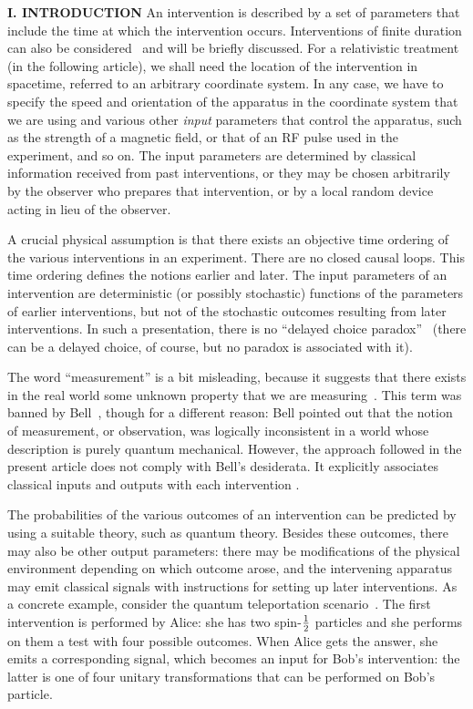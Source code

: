\begin{center}{\bf I. INTRODUCTION}
An intervention is described by a set of parameters that include the
time at which the intervention occurs. Interventions of finite duration
can also be considered~\cite{PW85} and will be briefly discussed. For
a relativistic treatment (in the following article), we shall need the
location of the intervention in spacetime, referred to an arbitrary
coordinate system. In any case, we have to specify the speed and
orientation of the apparatus in the coordinate system that we are using
and various other {\it input\/} parameters that control the apparatus,
such as the strength of a magnetic field, or that of an RF pulse used in
the experiment, and so on. The input parameters are determined by
classical information received from past interventions, or they may be
chosen arbitrarily by the observer who prepares that intervention, or by
a local random device acting in lieu of the observer.

A crucial physical assumption is that there exists an objective time
ordering of the various interventions in an experiment. There are no
closed causal loops. This time ordering defines the notions earlier and
later. The input parameters of an intervention are deterministic (or
possibly stochastic) functions of the parameters of earlier
interventions, but not of the stochastic outcomes resulting from later
interventions. In such a presentation, there is no ``delayed choice
paradox''~\cite{delayed} (there can be a delayed choice, of course, but
no paradox is associated with it).

The word ``measurement'' is a bit misleading, because it suggests that
there exists in the real world some unknown property that we are
measuring~\cite{qt}. This term was banned by Bell~\cite{Bell}, though
for a different reason: Bell pointed out that the notion of measurement,
or observation, was logically inconsistent in a world whose description
is purely quantum mechanical. However, the approach followed in the
present article does not comply with Bell's desiderata. It explicitly
associates classical inputs and outputs with each intervention
\cite{BJ,percival}.

The probabilities of the various outcomes of an intervention can be
predicted by using a suitable theory, such as quantum theory. Besides
these outcomes, there may also be other output parameters: there may
be modifications of the physical environment depending on which outcome
arose, and the intervening apparatus may emit classical signals with
instructions for setting up later interventions. As a concrete example,
consider the quantum teleportation scenario~\cite{telep}. The first
intervention is performed by Alice: she has two spin-$1\over2$ particles
and she performs on them a test with four possible outcomes. When Alice
gets the answer, she emits a corresponding signal, which becomes an
input for Bob's intervention: the latter is one of four unitary
transformations that can be performed on Bob's particle. 


\end{center}
